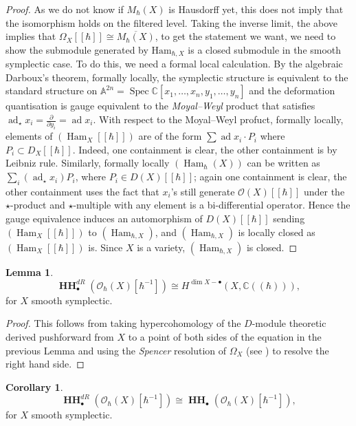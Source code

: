\documentclass[draft]{article}
\theoremstyle{definition}
\newtheorem{lemma}[theorem]{Lemma}
\newtheorem{corollary}[theorem]{Corollary}
\DeclareMathOperator{\Spec}{{Spec}}
\DeclareMathOperator{\Ham}{{Ham}}
\DeclareMathOperator{\ad}{ad}
\DeclareMathOperator{\HH}{\mathbf{HH}}
\newcommand{\doubleh}{[\![ \hbar ]\!]}
\newcommand{\OhX}{\mathcal{O}_\hbar(X)}
\newcommand{\MhX}{M_\hbar(X)}
\begin{document}
\begin{proof}
As we do not know if $\MhX$ is Hausdorff yet, this does not imply that the isomorphism holds on the filtered level. Taking the inverse limit, the above implies that $\Omega_X\doubleh\cong \overline{\MhX}$, to get the statement we want, we need to show the submodule generated by $\text{Ham}_{\hbar,X}$ is a closed submodule in the smooth symplectic case. To do this, we need a formal local calculation. By the algebraic Darboux's theorem, formally locally, the symplectic structure is equivalent to the standard structure on $\mathbb{A}^{2n}=\Spec\mathbb{C}[x_1,\dots,x_n,y_1,\dots,y_n]$ and the deformation quantisation is gauge equivalent to the \textit{Moyal--Weyl} product that satisfies $\ad_\star x_i=\frac{\partial}{\partial y_i}=\ad x_i$. With respect to the Moyal--Weyl profuct, formally locally, elements of $(\Ham_X\doubleh)$ are of the form $\sum \ad x_i \cdot P_i$ where $P_i\subset D_X\doubleh$. Indeed, one containment is clear, the other containment is by Leibniz rule. Similarly, formally locally $(\Ham_{\hbar}(X))$ can be written as $\sum_i(\ad_\star x_i) P_i$, where $P_i\in D(X)\doubleh$; again one containment is clear, the other containment uses the fact that $x_i$'s still generate $\mathcal{O}(X)\doubleh$ under the $\star$-product and $\star$-multiple with any element is a bi-differential operator. Hence the gauge equivalence induces an automorphism of $D(X)\doubleh$ sending $(\Ham_X\doubleh)$ to $(\Ham_{\hbar,X})$, and $(\Ham_{\hbar,X})$ is locally closed as $(\Ham_X\doubleh)$ is. Since $X$ is a variety, $(\Ham_{\hbar,X})$ is closed.
\end{proof}

\begin{lemma}
$$\HH_\bullet^{dR}(\OhX[\hbar^{-1}])\cong H^{\dim X-\bullet}(X,\mathbb{C}((\hbar))),$$ for $X$ smooth symplectic.
\end{lemma}

\begin{proof}
This follows from taking hypercohomology of the $D$-module theoretic derived pushforward from $X$ to a point of both sides of the equation in the previous Lemma and using the \textit{Spencer} resolution of $\Omega_X$ (see \cite{D-modules_perverse_sheaves_and_representation_theory}) to resolve the right hand side. 
\end{proof}

\begin{corollary}
$$\HH_\bullet^{dR}(\OhX[\hbar^{-1}])\cong \HH_\bullet(\OhX[\hbar^{-1}]),$$ for $X$ smooth symplectic.
\end{corollary}
\end{document}
